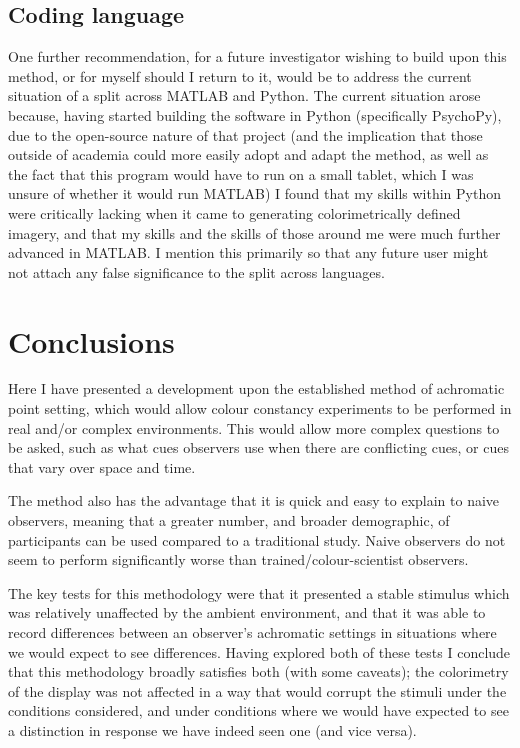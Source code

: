 \subsection{Coding language}

One further recommendation, for a future investigator wishing to build upon this method, or for myself should I return to it, would be to address the current situation of a split across \gls{MATLAB} and Python. The current situation arose because, having started building the software in Python (specifically PsychoPy), due to the open-source nature of that project (and the implication that those outside of academia could more easily adopt and adapt the method, as well as the fact that this program would have to run on a small tablet, which I was unsure of whether it would run \gls{MATLAB}) I found that my skills within Python were critically lacking when it came to generating colorimetrically defined imagery, and that my skills and the skills of those around me were much further advanced in \gls{MATLAB}. I mention this primarily so that any future user might not attach any false significance to the split across languages.

\section{Conclusions}

Here I have presented a development upon the established method of achromatic point setting, which would allow colour constancy experiments to be performed in real and/or complex environments. This would allow more complex questions to be asked, such as what cues observers use when there are conflicting cues, or cues that vary over space and time.

The method also has the advantage that it is quick and easy to explain to naive observers, meaning that a greater number, and broader demographic, of participants can be used compared to a traditional study. Naive observers do not seem to perform significantly worse than trained/colour-scientist observers.

The key tests for this methodology were that it presented a stable stimulus which was relatively unaffected by the ambient environment, and that it was able to record differences between an observer's achromatic settings in situations where we would expect to see differences. Having explored both of these tests I conclude that this methodology broadly satisfies both (with some caveats); the colorimetry of the display was not affected in a way that would corrupt the stimuli under the conditions considered, and under conditions where we would have expected to see a distinction in response we have indeed seen one (and vice versa).

